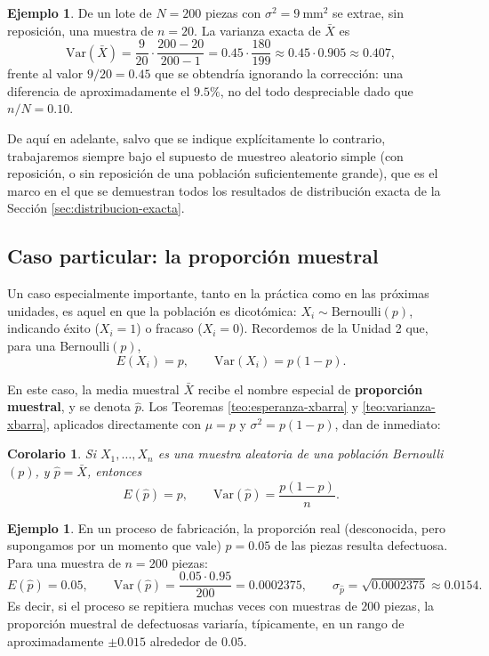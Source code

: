 \documentclass[11pt,a4paper]{article}
\theoremstyle{plain}
\newtheorem{corolario}[teorema]{Corolario}
\theoremstyle{definition}
\newtheorem{ejemplo}[teorema]{Ejemplo}
\theoremstyle{remark}
\begin{document}
\begin{ejemplo}
De un lote de $N=200$ piezas con $\sigma^2=9\ \text{mm}^2$ se extrae, sin reposición, una muestra de $n=20$. La varianza exacta de $\bar X$ es
$$\mathrm{Var}(\bar X) = \frac{9}{20}\cdot\frac{200-20}{200-1} = 0.45 \cdot \frac{180}{199} \approx 0.45\cdot 0.905 \approx 0.407,$$
frente al valor $9/20=0.45$ que se obtendría ignorando la corrección: una diferencia de aproximadamente el $9.5\%$, no del todo despreciable dado que $n/N=0.10$.
\end{ejemplo}

De aquí en adelante, salvo que se indique explícitamente lo contrario, trabajaremos siempre bajo el supuesto de muestreo aleatorio simple (con reposición, o sin reposición de una población suficientemente grande), que es el marco en el que se demuestran todos los resultados de distribución exacta de la Sección \ref{sec:distribucion-exacta}.

\subsection{Caso particular: la proporción muestral}

Un caso especialmente importante, tanto en la práctica como en las próximas unidades, es aquel en que la población es dicotómica: $X_i \sim \text{Bernoulli}(p)$, indicando éxito ($X_i=1$) o fracaso ($X_i=0$). Recordemos de la Unidad 2 que, para una Bernoulli$(p)$,
$$E(X_i) = p, \qquad \mathrm{Var}(X_i) = p(1-p).$$

En este caso, la media muestral $\bar X$ recibe el nombre especial de \textbf{proporción muestral}, y se denota $\hat p$. Los Teoremas \ref{teo:esperanza-xbarra} y \ref{teo:varianza-xbarra}, aplicados directamente con $\mu=p$ y $\sigma^2=p(1-p)$, dan de inmediato:

\begin{corolario}
Si $X_1,\dots,X_n$ es una muestra aleatoria de una población Bernoulli$(p)$, y $\hat p = \bar X$, entonces
$$E(\hat p) = p, \qquad \mathrm{Var}(\hat p) = \frac{p(1-p)}{n}.$$
\end{corolario}

\begin{ejemplo}
En un proceso de fabricación, la proporción real (desconocida, pero supongamos por un momento que vale) $p=0.05$ de las piezas resulta defectuosa. Para una muestra de $n=200$ piezas:
$$E(\hat p) = 0.05, \qquad \mathrm{Var}(\hat p) = \frac{0.05\cdot 0.95}{200} = 0.0002375, \qquad \sigma_{\hat p} = \sqrt{0.0002375}\approx 0.0154.$$
Es decir, si el proceso se repitiera muchas veces con muestras de $200$ piezas, la proporción muestral de defectuosas variaría, típicamente, en un rango de aproximadamente $\pm 0.015$ alrededor de $0.05$.
\end{ejemplo}
\end{document}
